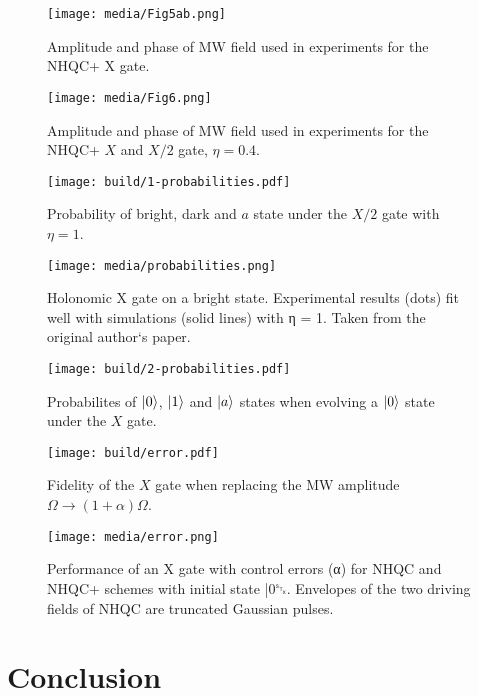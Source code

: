 \documentclass[%
reprint,
amsmath,amssymb,
aps,
]{revtex4-2}
\begin{document}
  \begin{figure}
    \centering
    \texttt{[image: media/Fig5ab.png]}
    \caption{Amplitude and phase of MW field used in experiments for the NHQC+ X gate.}
  \end{figure}
  \begin{figure}
    \centering
    \texttt{[image: media/Fig6.png]}
    \caption{Amplitude and phase of MW field used in experiments for the NHQC+ $X$ and $X/2$ gate,
    $\eta = 0.4$.}
  \end{figure}

  \begin{figure}
    \centering
    \texttt{[image: build/1-probabilities.pdf]}
    \caption{Probability of bright, dark and $a$ state under the $X/2$ gate with $\eta=1$.}
  \end{figure}

  \begin{figure}
    \centering
    \texttt{[image: media/probabilities.png]}
    \caption{Holonomic X gate on a bright state. Experimental results
    (dots) ﬁt well with simulations (solid lines) with η = 1. Taken from the original author`s paper.}
  \end{figure}

  \begin{figure}
    \centering
    \texttt{[image: build/2-probabilities.pdf]}
    \caption{Probabilites of $\ket{0}$, $\ket{1}$ and $\ket{a}$ states when evolving a $\ket{0}$
    state under the $X$ gate.}
  \end{figure}

  \begin{figure}
    \centering
    \texttt{[image: build/error.pdf]}
    \caption{Fidelity of the $X$ gate when replacing the MW amplitude $\Omega \rightarrow
    (1+\alpha)\Omega$.}
  \end{figure}


  \begin{figure}
    \centering
    \texttt{[image: media/error.png]}
    \caption{Performance of an X gate with control errors (α) for NHQC and
      NHQC+ schemes with initial state |0␂. Envelopes of the two
    driving ﬁelds of NHQC are truncated Gaussian pulses. }
  \end{figure}

  \section{Conclusion}
  \label{sec:Introduction}

  \appendix


  \nocite{*}


  
\end{document}
